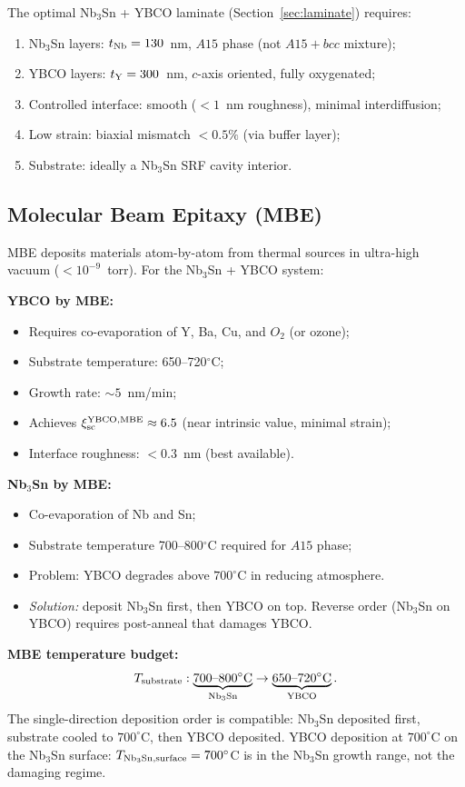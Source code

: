 \documentclass[11pt]{article}
\begin{document}
The optimal Nb$_3$Sn + YBCO laminate (Section~\ref{sec:laminate}) requires:
\begin{enumerate}
  \item Nb$_3$Sn layers: $t_{\rm Nb} = 130$~nm, $A15$ phase (not $A15+bcc$ mixture);
  \item YBCO layers: $t_{\rm Y} = 300$~nm, $c$-axis oriented, fully oxygenated;
  \item Controlled interface: smooth ($< 1$~nm roughness), minimal interdiffusion;
  \item Low strain: biaxial mismatch $< 0.5\%$ (via buffer layer);
  \item Substrate: ideally a Nb$_3$Sn SRF cavity interior.
\end{enumerate}

\subsection{Molecular Beam Epitaxy (MBE)}

MBE deposits materials atom-by-atom from thermal sources in ultra-high
vacuum ($< 10^{-9}$~torr). For the Nb$_3$Sn + YBCO system:

\textbf{YBCO by MBE:}
\begin{itemize}
  \item Requires co-evaporation of Y, Ba, Cu, and $O_2$ (or ozone);
  \item Substrate temperature: 650--720$^\circ$C;
  \item Growth rate: $\sim 5$~nm/min;
  \item Achieves $\xi_{\rm sc}^{\rm YBCO,MBE} \approx 6.5$ (near intrinsic
        value, minimal strain);
  \item Interface roughness: $< 0.3$~nm (best available).
\end{itemize}

\textbf{Nb$_3$Sn by MBE:}
\begin{itemize}
  \item Co-evaporation of Nb and Sn;
  \item Substrate temperature 700--800$^\circ$C required for $A15$ phase;
  \item Problem: YBCO degrades above $700^\circ$C in reducing atmosphere.
  \item \emph{Solution:} deposit Nb$_3$Sn first, then YBCO on top. Reverse
        order (Nb$_3$Sn on YBCO) requires post-anneal that damages YBCO.
\end{itemize}

\textbf{MBE temperature budget:}
\begin{equation}
T_{\rm substrate}: \underbrace{700\text{--}800^\circ\text{C}}_{\text{Nb}_3\text{Sn}} \to
  \underbrace{650\text{--}720^\circ\text{C}}_{\text{YBCO}}.
\label{eq:MBE-temp}
\end{equation}
The single-direction deposition order is compatible: Nb$_3$Sn deposited
first, substrate cooled to $700^\circ$C, then YBCO deposited. YBCO
deposition at $700^\circ$C on the Nb$_3$Sn surface:
$T_{\rm Nb_3Sn,surface} = 700^\circ$C is in the Nb$_3$Sn growth range,
not the damaging regime.
\end{document}
